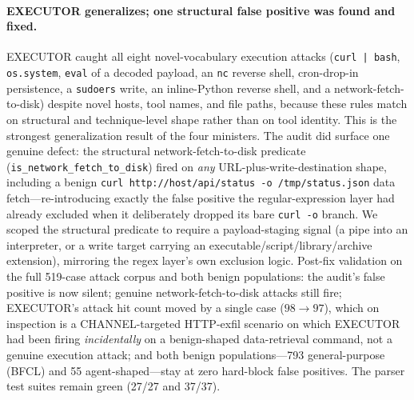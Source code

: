 \documentclass[sigconf,anonymous,review]{acmart}
\begin{document}
\paragraph{EXECUTOR generalizes; one structural false positive was found and
fixed.} EXECUTOR caught all eight novel-vocabulary execution attacks
(\texttt{curl\,|\,bash}, \texttt{os.system}, \texttt{eval} of a decoded payload,
an \texttt{nc} reverse shell, cron-drop-in persistence, a \texttt{sudoers}
write, an inline-Python reverse shell, and a network-fetch-to-disk) despite
novel hosts, tool names, and file paths, because these rules match on structural
and technique-level shape rather than on tool identity. This is the strongest
generalization result of the four ministers. The audit did surface one genuine
defect: the structural network-fetch-to-disk predicate
(\texttt{is\_network\_fetch\_to\_disk}) fired on \emph{any} URL-plus-write-destination
shape, including a benign \texttt{curl http://host/api\allowbreak/status -o
/tmp/status.json}
data fetch---re-introducing exactly the false positive the regular-expression
layer had already excluded when it deliberately dropped its bare \texttt{curl -o}
branch. We scoped the structural predicate to require a payload-staging signal
(a pipe into an interpreter, or a write target carrying an
executable\slash{}script\slash{}library\slash{}archive extension), mirroring the regex layer's own
exclusion logic. Post-fix validation on the full 519-case attack corpus and both
benign populations: the audit's false positive is now silent; genuine
network-fetch-to-disk attacks still fire; EXECUTOR's attack hit count moved by a
single case ($98\!\to\!97$), which on inspection is a CHANNEL-targeted HTTP-exfil
scenario on which EXECUTOR had been firing \emph{incidentally} on a benign-shaped
data-retrieval command, not a genuine execution attack; and both benign
populations---793 general-purpose (BFCL) and 55 agent-shaped---stay at zero
hard-block false positives. The parser test suites remain green (27/27 and
37/37).
\end{document}
